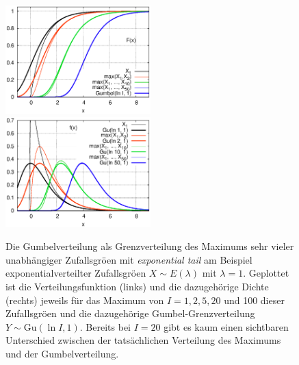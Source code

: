 \begin{figure}
 \includegraphics[width=0.5\textwidth]{./figsDiscr/gumbelGrenz_F.eps}   
 \includegraphics[width=0.5\textwidth]{./figsDiscr/gumbelGrenz_f.eps}   
  \caption{\label{fig:gumbelGrenz1}Die Gumbelverteilung als
Grenzverteilung des Maximums sehr vieler unabh\"angiger
Zufallsgr\"o\3en mit \textit{exponential tail} am Beispiel
exponentialverteilter Zufallsgr\"o\3en $X\sim E(\lambda)$ mit 
$\lambda=1$.
Geplottet ist die Verteilungsfunktion (links) und die dazugeh\"orige
Dichte (rechts) jeweils f\"ur das Maximum von $I=1,2,5,20$ und 100 
dieser Zufallsgr\"o\3en und die dazugeh\"orige
Gumbel-Grenzverteilung $Y\sim \text{Gu}(\ln I,1)$.
Bereits bei $I=20$ gibt es kaum einen sichtbaren Unterschied
zwischen der tats\"achlichen Verteilung des Maximums und der
Gumbelverteilung. 
}
\end{figure}


